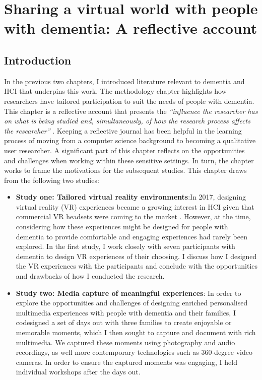 \chapter{Sharing a virtual world with people with dementia: A reflective account}
\label{NegotatingReseacherParticipantRelationships}

\section{Introduction}
\label{CH4:Intro}
In the previous two chapters, I introduced literature relevant to dementia and HCI that underpins this work. The methodology chapter highlights how researchers have tailored participation to suit the needs of people with dementia. This chapter is a reflective account that presents the \textit{``influence the researcher has on what is being studied and, simultaneously, of how the research process affects the researcher''} \citep{probst2014double}. Keeping a reflective journal has been helpful in the learning process of moving from a computer science background to becoming a qualitative user researcher. A significant part of this chapter reflects on the opportunities and challenges when working within these sensitive settings. In turn, the chapter works to frame the motivations for the subsequent studies. This chapter draws from the following two studies: 

\begin{itemize}
    \item  \textbf{Study one: Tailored virtual reality environments}:In 2017, designing virtual reality (VR) experiences became a growing interest in HCI given that commercial VR headsets were coming to the market \citep{hassan_digitality_2019}. However, at the time, considering how these experiences might be designed for people with dementia to provide comfortable and engaging experiences had rarely been explored. In the first study, I work closely with seven participants with dementia to design VR experiences of their choosing. I discuss how I designed the VR experiences with the participants and conclude with the opportunities and drawbacks of how I conducted the research.

    \item \textbf{Study two: Media capture of meaningful experiences}:    In order to explore the opportunities and challenges of designing enriched personalised multimedia experiences with people with dementia and their families, I codesigned a set of days out with three families to create enjoyable or memorable moments, which I then sought to capture and document with rich multimedia. We captured these moments using photography and audio recordings, as well more contemporary technologies such as 360-degree video cameras. In order to ensure the captured moments was engaging, I held individual workshops after the days out.
\end{itemize}

